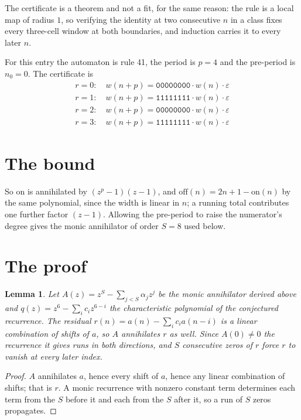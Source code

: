 \documentclass[11pt,a4paper]{article}
\theoremstyle{plain}
\newtheorem{lemma}[theorem]{Lemma}
\theoremstyle{definition}
\begin{document}
The certificate is a theorem and not a fit, for the same reason: the rule is a local map of
radius $1$, so verifying the identity at two consecutive $n$ in a class fixes every three-cell
window at both boundaries, and induction carries it to every later $n$.

For this entry the automaton is rule 41, the period is $p=4$ and the pre-period is $n_0=0$.
The certificate is
\begin{gather*}
r=0:\quad w(n+p) = \texttt{00000000} \cdot w(n) \cdot \varepsilon \\
r=1:\quad w(n+p) = \texttt{11111111} \cdot w(n) \cdot \varepsilon \\
r=2:\quad w(n+p) = \texttt{00000000} \cdot w(n) \cdot \varepsilon \\
r=3:\quad w(n+p) = \texttt{11111111} \cdot w(n) \cdot \varepsilon
\end{gather*}

\section{The bound}

So
$\mathrm{on}$ is annihilated by $(z^p-1)(z-1)$, and $\mathrm{off}(n)=2n+1-\mathrm{on}(n)$ by
the same polynomial, since the width is linear in $n$; a running total contributes one further
factor $(z-1)$. Allowing the pre-period to raise the numerator's degree gives the monic
annihilator of order $S=8$ used below.

\section{The proof}

\begin{lemma}\label{lem:crit}
Let $A(z)=z^S-\sum_{j<S}\alpha_jz^{j}$ be the monic annihilator derived above and
$q(z)=z^{6}-\sum_ic_iz^{6-i}$ the characteristic polynomial of the conjectured
recurrence. The residual $r(n)=a(n)-\sum_ic_ia(n-i)$ is a linear combination of shifts of $a$,
so $A$ annihilates $r$ as well. Since $A(0)\ne0$ the recurrence it gives runs in both
directions, and $S$ consecutive zeros of $r$ force $r$ to vanish at every later index.
\end{lemma}

\begin{proof}
$A$ annihilates $a$, hence every shift of $a$, hence any linear combination of shifts; that is
$r$. A monic recurrence with nonzero constant term determines each term from the $S$ before it
and each from the $S$ after it, so a run of $S$ zeros propagates.
\end{proof}
\end{document}
